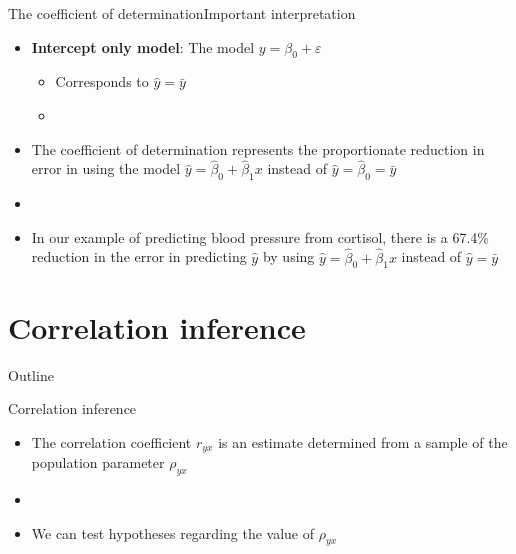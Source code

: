 \documentclass[xcolor=dvipsnames]{beamer}
\begin{document}
\begin{frame}{The coefficient of determination}{Important interpretation}
	\begin{itemize}
		\item \textbf{Intercept only model}: The model $y = \beta_0 + \varepsilon$ \pause
		\begin{itemize}
			\item Corresponds to $\hat{y} = \bar{y}$ \pause
			\item[]
		\end{itemize}
		\item The coefficient of determination represents the proportionate reduction in error in using the model $\hat{y}=\hat{\beta}_0 + \hat{\beta}_1 x$ instead of $\hat{y}=\hat{\beta}_0 =\bar{y}$ \pause
		\item[]
		\item In our example of predicting blood pressure from cortisol, there is a 67.4\% reduction in the error in predicting $\hat{y}$ by using $\hat{y}=\hat{\beta}_0 + \hat{\beta}_1 x$ instead of $\hat{y} = \bar{y}$
	\end{itemize}
\end{frame}


\section{Correlation inference}
\begin{frame}{Outline}
	\tableofcontents[currentsection,subsectionstyle=show/shaded/hide]
\end{frame}

\begin{frame}{Correlation inference}
	\begin{itemize}
		\item The correlation coefficient $r_{yx}$ is an estimate determined from a sample of the population parameter $\rho_{yx}$ \pause
		\item[]
		\item We can test hypotheses regarding the value of $\rho_{yx}$
	\end{itemize}
\end{frame}
\end{document}
